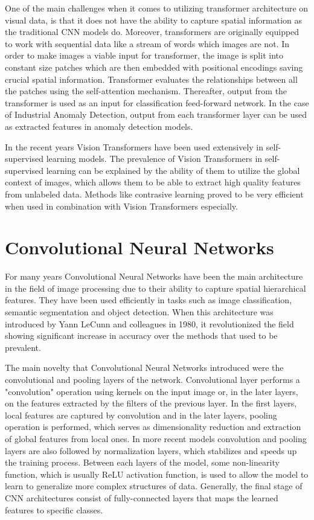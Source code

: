 One of the main challenges when it comes to utilizing transformer architecture on visual data, is that it does not have the ability to capture spatial information as the traditional CNN models do. Moreover, transformers are originally equipped to work with sequential data like a stream of words which images are not. In order to make images a viable input for transformer, the image is split into constant size patches which are then embedded with positional encodings saving crucial spatial information. Transformer evaluates the relationships between all the patches using the self-attention mechanism. Thereafter, output from the transformer is used as an input for classification feed-forward network. In the case of Industrial Anomaly Detection, output from each transformer layer can be used as extracted features in anomaly detection models.


In the recent years Vision Transformers have been used extensively in self-supervised learning models. The prevalence of Vision Transformers in self-supervised learning can be explained by the ability of them to utilize the global context of images, which allows them to be able to extract high quality features from unlabeled data. Methods like contrasive learning proved to be very efficient when used in combination with Vision Transformers especially.

\section{Convolutional Neural Networks}
\label{cnn}

For many years Convolutional Neural Networks have been the main architecture in the field of image processing due to their ability to capture spatial hierarchical features. They have been used efficiently in tasks such as image classification, semantic segmentation and object detection. When this architecture was introduced by Yann LeCunn and colleagues in 1980, it revolutionized the field showing significant increase in accuracy over the methods that used to be prevalent.

The main novelty that Convolutional Neural Networks introduced were the convolutional and pooling layers of the network. Convolutional layer performs a "convolution" operation using kernels on the input image or, in the later layers, on the features extracted by the filters of the previous layer. In the first layers, local features are captured by convolution and in the later layers, pooling operation is performed, which serves as dimensionality reduction and extraction of global features from local ones. In more recent models convolution and pooling layers are also followed by normalization layers, which stabilizes and speeds up the training process. Between each layers of the model, some non-linearity function, which is usually ReLU activation function, is used to allow the model to learn to generalize more complex structures of data. Generally, the final stage of CNN architectures consist of fully-connected layers that maps the learned features to specific classes.

